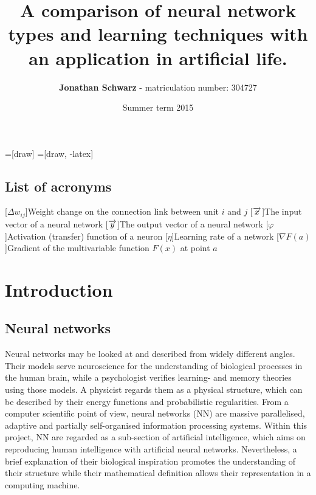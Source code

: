 \documentclass[10pt,a4paper,DIV=11]{scrreprt}
\title
{
     A comparison of neural network types and learning techniques with an application in artificial life.
}
\author
{
    \textbf{Jonathan Schwarz} - matriculation number: 304727
}
\date
{
    Summer term 2015
}
\begin{document}
=[draw]
=[draw, -latex] 


\maketitle
\thispagestyle{empty}
\newpage
{\large\tableofcontents}
\newpage

\thispagestyle{empty}

\section*{List of acronyms}
\begin{acronym}
    [$\Delta w_{ij}$]{Weight change  on the connection link between unit $i$ and $j$}
    [$\protect \overrightarrow{x}$]{The input vector of a neural network}
    [$\protect \overrightarrow{y}$]{The output vector of a neural network}
    [$\varphi$]{Activation (transfer) function of a neuron}
    [$\eta$]{Learning rate of a network}
    [$\nabla F(a)$]{Gradient of the multivariable function $F(x)$ at point $a$}
\end{acronym}

\newpage

\chapter{Introduction}
\section{Neural networks}
Neural networks may be looked at and described from widely different angles. Their models serve neuroscience for the understanding of biological processes in the human brain, while a psychologist verifies learning- and memory theories using those models. A physicist regards them as a physical structure, which can be described by their energy functions and probabilistic regularities. From a computer scientific point of view, neural networks (NN) are massive parallelised, adaptive and partially self-organised information processing systems. \cite{NNGER}
Within this project, NN are regarded as a sub-section of artificial intelligence, which aims on reproducing human intelligence with artificial neural networks. Nevertheless, a brief explanation of their biological inspiration promotes the understanding of their structure while their mathematical definition allows their representation in a computing machine.
\end{document}
